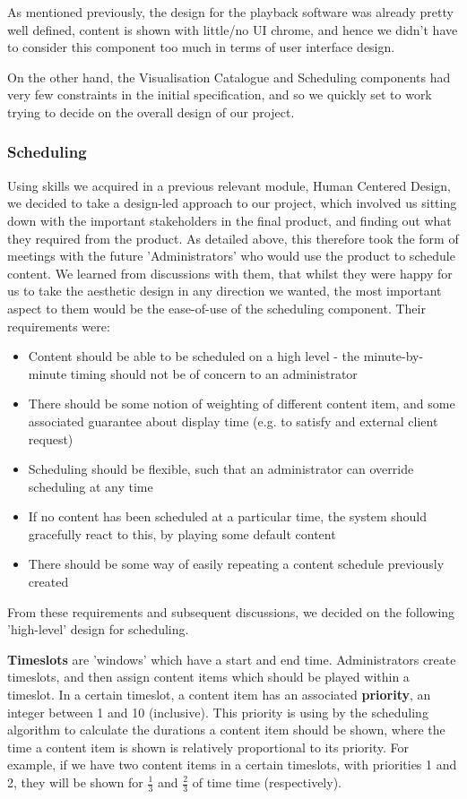 \documentclass[a4paper, titlepage]{article}
\begin{document}
As mentioned previously, the design for the playback software was already pretty well defined, content is shown with little/no UI chrome, and hence we didn't have to consider this component too much in terms of user interface design.

On the other hand, the Visualisation Catalogue and Scheduling components had very few constraints in the initial specification, and so we quickly set to work trying to decide on the overall design of our project.

\subsubsection{Scheduling}
Using skills we acquired in a previous relevant module, Human Centered Design, we decided to take a design-led approach to our project, which involved us sitting down with the important stakeholders in the final product, and finding out what they required from the product. As detailed above, this therefore took the form of meetings with the future 'Administrators' who would use the product to schedule content. We learned from discussions with them, that whilst they were happy for us to take the aesthetic design in any direction we wanted, the most important aspect to them would be the ease-of-use of the scheduling component. Their requirements were:
\begin{itemize}
\item Content should be able to be scheduled on a high level - the minute-by-minute timing should not be of concern to an administrator
\item There should be some notion of weighting of different content item, and some associated guarantee about display time (e.g. to satisfy and external client request)
\item Scheduling should be flexible, such that an administrator can override scheduling at any time
\item If no content has been scheduled at a particular time, the system should gracefully react to this, by playing some default content
\item There should be some way of easily repeating a content schedule previously created
\end{itemize}

From these requirements and subsequent discussions, we decided on the following 'high-level' design for scheduling.

\textbf{Timeslots} are 'windows' which have a start and end time. Administrators create timeslots, and then assign content items which should be played within a timeslot. In a certain timeslot, a content item has an associated \textbf{priority}, an integer between 1 and 10 (inclusive). This priority is using by the scheduling algorithm to calculate the durations a content item should be shown, where the time a content item is shown is relatively proportional to its priority. For example, if we have two content items in a certain timeslots, with priorities 1 and 2, they will be shown for $\frac{1}{3}$ and $\frac{2}{3}$ of time time (respectively).
\end{document}
